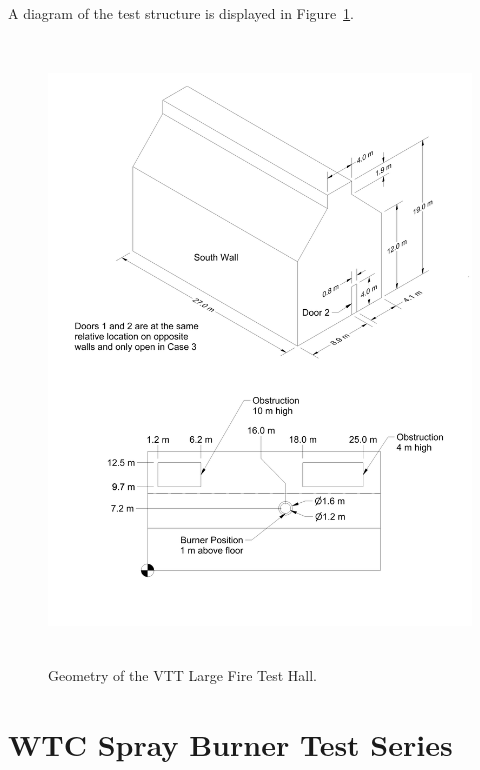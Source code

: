 A diagram of the test structure is displayed in Figure~\ref{VTT_Drawing}.
\begin{figure}
\begin{center}
\includegraphics[height=6.5in]{FIGURES/VTT/VTT_Drawing}
\end{center}
\caption{Geometry of the VTT Large Fire Test Hall.}
\label{VTT_Drawing}
\end{figure}


\clearpage





\section{WTC Spray Burner Test Series}

